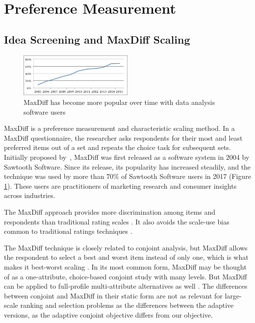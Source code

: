 \documentclass[nonblindrev]{informs3}
\begin{document}
\section{Preference Measurement}
\subsection{Idea Screening and MaxDiff Scaling}
\begin{figure}
\caption{MaxDiff has become more popular over time with data analysis software users} \label{fig:pop}
\begin{center}
\includegraphics[width=0.5\textwidth]{plots/maxdiffpop}
\end{center}
\end{figure}
MaxDiff is a preference measurement and characteristic scaling method. In a MaxDiff questionnaire, the researcher asks respondents for their most and least preferred items out of a set and repeats the choice task for subsequent sets. Initially proposed by~\cite{louviere1991best}, MaxDiff was first released as a software system in 2004 by Sawtooth Software. Since its release, its popularity has increased steadily, and the technique was used by more than 70\% of Sawtooth Software users in 2017 (Figure \ref{fig:pop}). These users are practitioners of marketing research and consumer insights across industries.

The MaxDiff approach provides more discrimination among items and respondents than traditional rating scales \citep{cohen2004s}. It also avoids the scale-use bias common to traditional ratings techniques \citep{marley2005some,chrzan2006empirical}.

The MaxDiff technique is closely related to conjoint analysis, but MaxDiff allows the respondent to select a best and worst item instead of only one, which is what makes it best-worst scaling \citep{marley2005some}. In its most common form, MaxDiff may be thought of as a one-attribute, choice-based conjoint study with many levels. But MaxDiff can be applied to full-profile multi-attribute alternatives as well \citep{marley2012models}. The differences between conjoint and MaxDiff in their static form are not as relevant for large-scale ranking and selection problems as the differences between the adaptive versions, as the adaptive conjoint objective differs from our objective.
\end{document}
